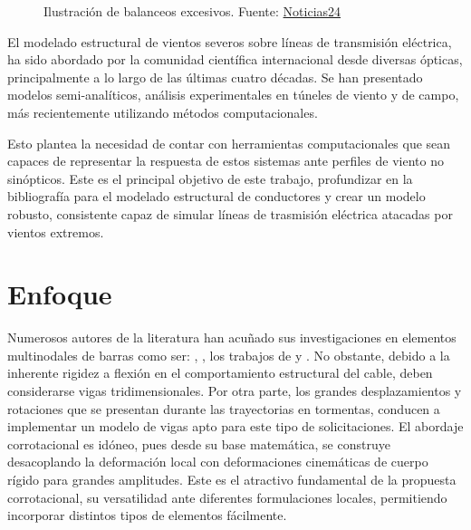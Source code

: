 \begin{figure}[htbp]
	\centering
	\def\svgwidth{100mm}
	
	\caption{Ilustración de balanceos excesivos. Fuente: \href{https://www.noticias24.com.uy/2019/06/dos-trabajadores-cayeron-de-una-altura.html}{Noticias24}}
	\label{fig:INTRO:IlusExcesiveBalance}
\end{figure}  

El modelado estructural de vientos severos sobre líneas de transmisión eléctrica, ha sido abordado por la comunidad científica internacional desde diversas ópticas, principalmente a lo largo de las últimas cuatro décadas. Se han presentado modelos semi-analíticos, análisis experimentales en túneles de viento y de campo, más recientemente utilizando métodos computacionales.

Esto plantea la necesidad de contar con herramientas computacionales que sean capaces de representar la respuesta de estos sistemas ante perfiles de viento no sinópticos. Este es el principal objetivo de este trabajo, profundizar en la bibliografía para el modelado estructural de conductores y crear un modelo robusto, consistente capaz de simular líneas de trasmisión eléctrica atacadas por vientos extremos.
 


\section{Enfoque}

Numerosos autores de la literatura han acuñado sus investigaciones en elementos multinodales de barras como ser: \cite{desai1995finite}, \cite{yan2009numerical}, los trabajos de \cite{gani2010dynamic} y \cite{yang2016nonlinear}. No obstante, debido a la inherente rigidez a flexión en el comportamiento estructural del cable, deben considerarse vigas tridimensionales. Por otra parte, los grandes desplazamientos y rotaciones que se presentan durante las trayectorias en tormentas, conducen a implementar un modelo de vigas apto para este tipo de solicitaciones. El abordaje corrotacional es idóneo, pues desde su base matemática, se construye desacoplando la deformación local con deformaciones cinemáticas de cuerpo rígido para grandes amplitudes. Este es el atractivo fundamental de la propuesta corrotacional, su versatilidad ante diferentes formulaciones locales, permitiendo incorporar distintos tipos de elementos fácilmente.

